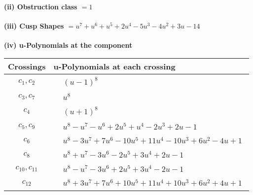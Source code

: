\documentclass[1p]{elsarticle_modified}
\theoremstyle{definition}
\begin{document}
\flushleft \textbf{(ii) Obstruction class $= 1$}\\~\\
\flushleft \textbf{(iii) Cusp Shapes $= u^7+u^6+u^5+2 u^4-5 u^3-4 u^2+3 u-14$}\\~\\
\newpage\renewcommand{\arraystretch}{1}
\flushleft \textbf{(iv) u-Polynomials at the component}\newline \\
\begin{tabular}{m{50pt}|m{274pt}}
Crossings & \hspace{64pt}u-Polynomials at each crossing \\
\hline $$\begin{aligned}c_{1},c_{2}\end{aligned}$$&$\begin{aligned}
&(u-1)^8
\end{aligned}$\\
\hline $$\begin{aligned}c_{3},c_{7}\end{aligned}$$&$\begin{aligned}
&u^8
\end{aligned}$\\
\hline $$\begin{aligned}c_{4}\end{aligned}$$&$\begin{aligned}
&(u+1)^8
\end{aligned}$\\
\hline $$\begin{aligned}c_{5},c_{9}\end{aligned}$$&$\begin{aligned}
&u^8- u^7- u^6+2 u^5+u^4-2 u^3+2 u-1
\end{aligned}$\\
\hline $$\begin{aligned}c_{6}\end{aligned}$$&$\begin{aligned}
&u^8-3 u^7+7 u^6-10 u^5+11 u^4-10 u^3+6 u^2-4 u+1
\end{aligned}$\\
\hline $$\begin{aligned}c_{8}\end{aligned}$$&$\begin{aligned}
&u^8+u^7-3 u^6-2 u^5+3 u^4+2 u-1
\end{aligned}$\\
\hline $$\begin{aligned}c_{10},c_{11}\end{aligned}$$&$\begin{aligned}
&u^8- u^7-3 u^6+2 u^5+3 u^4-2 u-1
\end{aligned}$\\
\hline $$\begin{aligned}c_{12}\end{aligned}$$&$\begin{aligned}
&u^8+3 u^7+7 u^6+10 u^5+11 u^4+10 u^3+6 u^2+4 u+1
\end{aligned}$\\
\hline
\end{tabular}\\~\\
\end{document}
